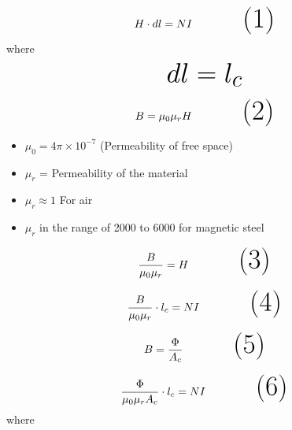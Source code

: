 \documentclass{article}
\begin{document}
\vspace{0.5cm} %
\begin{equation}
   \Huge  {H} \cdot d{l} = NI \tag{1}
\end{equation}
\Large where
\vspace{0.5cm} %
\[
   \text{\Huge $dl = l_c$}
\]


\vspace{0.5cm} %
\begin{equation}
    \Huge {B} = \mu_0 \mu_r {H}\tag{2}
\end{equation}

\vspace{0.5cm} %
\large
\begin{itemize}
   \item \( \mu_0 = 4 \pi \times 10^{-7} \) (Permeability of free space)
   \item \( \mu_r \) = Permeability of the material
   \item \( \mu_r \approx 1 \) For air
   \item \( \mu_r \) in the range of 2000 to 6000 for magnetic steel
\end{itemize}


\vspace{0.5cm} %
\begin{equation}
   \Huge  \frac{B}{\mu_0 \mu_r} = {H}\tag{3}
\end{equation}

\vspace{0.5cm} %
\begin{equation}
   \Huge  \frac{B}{\mu_0 \mu_r} \cdot {l_c}= NI \tag{4}
\end{equation}


\vspace{0.5cm} %
\begin{equation}
   \Huge  {B} =\frac {\Phi}{A_c}\tag{5}
\end{equation}

\vspace{0.5cm} %
\begin{equation}
   \Huge  \frac{\Phi}{\mu_0 \mu_rA_c} \cdot {l_c}= NI \tag{6}
\end{equation}\vspace{0.5cm} %
where
\end{document}
